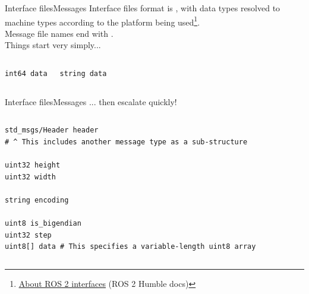 \begin{frame}[fragile]{Interface files}{Messages}
	Interface files format is , with data types resolved to machine types according to the platform being used\footnote{\href{https://docs.ros.org/en/humble/Concepts/About-ROS-Interfaces.html}{\color{blue}\underline{About ROS 2 interfaces}} (ROS 2 Humble docs)}.\\
	Message file names end with .\\
	Things start very simply...

	\begin{columns}
		\begin{lstlisting}[language=ros2msg, caption=Definition of the \texttt{std\_msgs/msg/Int64} message.]
int64 data\end{lstlisting}

		\begin{lstlisting}[language=ros2msg, caption=Definition of the \texttt{std\_msgs/msg/String} message.]
string data\end{lstlisting}
	\end{columns}

\end{frame}
\begin{frame}[fragile]{Interface files}{Messages}
	... then escalate quickly!

	\begin{columns}
		\column{.9\textwidth}
		\begin{lstlisting}[language=ros2msg, caption=Definition of the \texttt{sensor\_msgs/msg/Image} composite message.]
std_msgs/Header header
# ^ This includes another message type as a sub-structure

uint32 height
uint32 width

string encoding

uint8 is_bigendian
uint32 step
uint8[] data # This specifies a variable-length uint8 array\end{lstlisting}
	\end{columns}

\end{frame}
